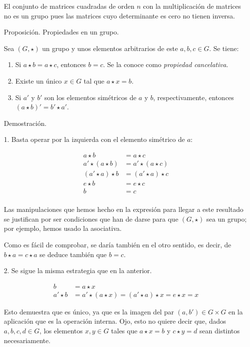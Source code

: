 El conjunto de matrices cuadradas de orden $n$ con la multiplicación de
matrices no es un grupo pues las matrices cuyo determinante es cero no
tienen inversa.

Proposición. Propiedades en un grupo.

Sea $(G, \star)$ un grupo y unos elementos arbitrarios de este $a, b, c \in
G$. Se tiene:

\begin{enumerate}
  \item Si $a \star b = a \star c$, entonces $b = c$. Se la conoce como
    \emph{propiedad cancelativa}.
  \item Existe un único $x \in G$ tal que $a \star x = b$.
  \item Si $a'$ y $b'$ son los elementos simétricos de $a$ y $b$,
    respectivamente, entonces $(a \star b)' = b' \star a'$.
\end{enumerate}

Demostración.

1. Basta operar por la izquierda con el elemento simétrico de $a$:

\begin{align*}
  a \star b &= a \star c \\
  a' \star (a \star b) &= a' \star (a \star c) \\
  (a' \star a) \star b &= (a' \star a) \star c \\
  e \star b &= e \star c \\
  b &= c \\
\end{align*}

\noindent Las manipulaciones que hemos hecho en la expresión para llegar a
este resultado se justifican por ser condiciones que han de darse para que
$(G, \star)$ sea un grupo; por ejemplo, hemos usado la asociativa.

Como es fácil de comprobar, se daría también en el otro sentido, es decir,
de $b \star a = c \star a$ se deduce también que $b = c$.

2. Se sigue la misma estrategia que en la anterior.

\begin{align*}
  b &= a \star x \\
  a' \star b &= a' \star (a \star x) = (a' \star a) \star x = e \star x = x
\end{align*}

\noindent Esto demuestra que es único, ya que es la imagen del par $(a, b')
\in G \times G$ en la aplicación que es la operación interna. Ojo, esto no
quiere decir que, dados $a, b, c, d \in G$, los elementos $x, y \in G$ tales
que $a \star x = b$ y $c \star y = d$ sean distintos necesariamente.

